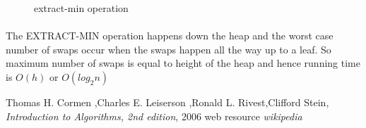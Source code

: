 \documentclass[11pt,a4paper]{amsart}
\theoremstyle{plain}
\numberwithin{equation}{section}
\begin{document}
\begin{figure}[h]
\caption{extract-min operation}
\end{figure}

\paragraph{}
\noindent The EXTRACT-MIN operation happens down the heap and the worst case number of swaps occur when the swaps happen all the way up to a leaf. So maximum number of swaps is equal to height of the heap and hence running time is $O(h)$ or $O(log_2n)$
\\
\begin{thebibliography}{}
\bibitem {}Thomas H. Cormen ,Charles E. Leiserson ,Ronald L. Rivest,Clifford Stein, \textit{Introduction to Algorithms, 2nd edition}, 2006
\bibitem{} web resource \textit{wikipedia}
\end{thebibliography}
\end{document}
